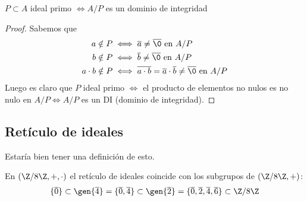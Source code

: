 \begin{pro}
	$P \subset A$ ideal primo $\iff A/P$ es un dominio de integridad
\end{pro}

\begin{figure}[h]
	\centering
\end{figure}

\begin{proof}
	Sabemos que
	\begin{align*}
	a \notin P &\iff \overline{a} \neq \overline{\0} \text{ en } A/P \\
	b \notin P &\iff \overline{b} \neq \overline{\0} \text{ en } A/P \\
	a\cdot b \notin P &\iff \overline{a\cdot b} = \overline{a}\cdot \overline{b} \neq \overline{\0} \text{ en } A/P
	\end{align*}
	Luego es claro que $P$ ideal primo $\iff$ el producto de elementos no nulos es no nulo en $A/P \iff A/P$ es un DI (dominio de integridad).
\end{proof}


\subsection{Retículo de ideales}

\begin{dfn}
	Estaría bien tener una definición de esto.
\end{dfn}


\begin{ej}
	En $(\Z/8\Z, +, \cdot)$ el retículo de ideales coincide con los subgrupos de $(\Z/8\Z, +)$:
	\begin{align*}
	\{\overline{0}\} \subset \gen{\overline{4}} = \{\overline{0}, \overline{4}\} \subset \gen{\overline{2}} = \{\overline{0}, \overline{2}, \overline{4}, \overline{6}\} \subset \Z/8\Z
	\end{align*}
\end{ej}

